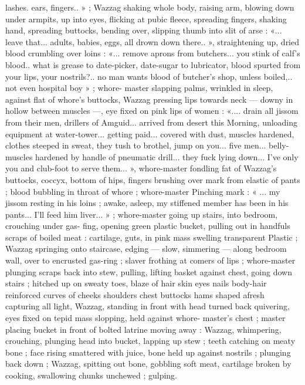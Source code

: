 lashes. ears, fingers.. » ; Wazzag shaking whole body, raising arm,
blowing down under armpits, up into eyes, flicking at pubic fleece,
spreading fingers, shaking hand, spreading buttocks, bending over,
slipping thumb into slit of arse : «... leave that... adults, babies, eggs,
all drown down there.. », straightening up, dried blood crumbling
over loins : «... remove aprons from butchers... you stink of calf’s
blood.. what is grease to date-picker, date-sugar to lubricator, blood
spurted from your lips, your nostrils?.. no man wants blood of
butcher's shop, unless boiled,.. not even hospital boy » ; whore-
master slapping palms, wrinkled in sleep, against flat of whore's
buttocks, Wazzag pressing lips towards neck --- downy in hollow
between muscles ---, eye fixed on pink lips of women : «.... drain all
jissom from their men, drillers of Amguid... arrived from desert this
Morning, unloading equipment at water-tower... getting paid...
covered with dust, muscles hardened, clothes steeped in sweat, they
tush to brothel, jump on you... five men... belly-muscles hardened by
handle of pneumatic drill... they fuck lying down... I've only you and
club-foot to serve them... », whore-master fondling fat of Wazzag's
buttocks, coccyx, bottom of hips, fingers brushing over mark from
elastic of pants ; blood bubbling in throat of whore ; whore-master
Pinching mark : « ... my jissom resting in his loins ; awake, asleep, my
stiffened member has been in his pants... I'll feed him liver... » ;
whore-master going up stairs, into bedroom, crouching under gas-
fing, opening green plastic bucket, pulling out in handfuls scraps of
boiled meat : cartilage, guts, in pink mass swelling transparent
Plastic ; Wazzag springing onto staircase, edging --- slow, simmering
--- along bedroom wall, over to encrusted gas-ring ; slaver frothing
at comers of lips ; whore-master plunging scraps back into stew,
pulling, lifting basket against chest, going down stairs ; hitched up
on sweaty toes, blaze of hair skin eyes nails body-hair reinforced
curves of cheeks shoulders chest buttocks hams shaped afresh
capturing all light, Wazzag, standing in front with head turned back
quivering, eyes fixed on tepid mass slopping, held against whore-
master’s chest ; master placing bucket in front of bolted latrine
moving away : Wazzag, whimpering, crouching, plunging head into
bucket, lapping up stew ; teeth catching on meaty bone ; face rising
smattered with juice, bone held up against nostrils ; plunging back
down ; Wazzag, spitting out bone, gobbling soft meat, cartilage
broken by cooking, swallowing chunks unchewed ; gulping.
